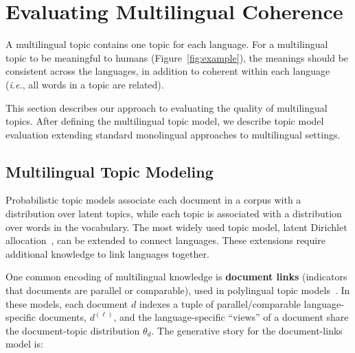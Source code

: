 

\section{Evaluating Multilingual Coherence}
\label{sec:eval}

A multilingual topic contains one topic for each
language.  For a multilingual topic to be meaningful to humans
(Figure~\ref{fig:example}), the meanings should be consistent across
the languages, in addition to coherent within each language
(\textit{i.e.}, all words in a topic are related).

This section describes our approach to evaluating the quality of
multilingual topics.  After defining the multilingual topic model, we
describe topic model evaluation extending standard monolingual
approaches to multilingual settings.

\subsection{Multilingual Topic Modeling}

Probabilistic topic models associate each document in a corpus with a
distribution over latent topics, while each topic is associated with a
distribution over words in the vocabulary.  The most widely used topic
model, latent Dirichlet allocation~\cite[\textsc{lda}]{blei2003}, can
be extended to connect languages.  These extensions require additional
knowledge to link languages together.

One common encoding of multilingual knowledge is \textbf{document
  links} (indicators that documents are parallel or comparable), used
in polylingual topic models~\cite{MimnoWNSM09,NiSHC09}.  In these
models, each document $d$ indexes a tuple of parallel/comparable
language-specific documents, $d^{(\ell)}$, and the language-specific
``views'' of a document share the document-topic distribution $\theta_d$.  The
generative story for the document-links model is: {
  \setlength{\interspacetitleruled}{0pt}
  \setlength{\algotitleheightrule}{0pt}
	\begin{algorithm}
	\small
	\end{algorithm}
}

